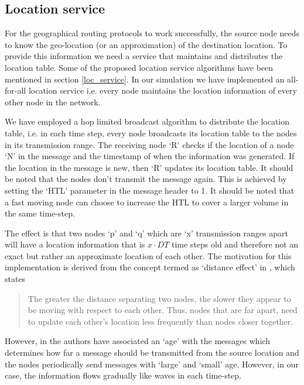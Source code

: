 \subsection{Location service} \label{loc_service_impl}

For the geographical routing protocols to work successfully, the source node needs to know the geo-location (or an approximation) of the destination location. To provide this information we need a service that maintains and distributes the location table. Some of the proposed location service algorithms have been mentioned in section \ref{loc_service}. In our simulation we have implemented an all-for-all location service i.e. every node maintains the location information of every other node in the network. 

We have employed a hop limited broadcast algorithm to distribute the location table, i.e. in each time step, every node broadcasts its location table to the nodes in its transmission range. The receiving node `R' checks if the location of a node `N' in the message and the timestamp of when the information was generated. If the location in the message is new, then `R' updates its location table. It should be noted that the nodes don't transmit the message again. This is achieved by setting the `HTL' parameter in the message header to 1. It should be noted that a fast moving node can choose to increase the HTL to cover a larger volume in the same time-step.

The effect is that two nodes `p' and `q' which are `x' transmission ranges apart will have a location information that is $x \cdot DT $ time steps old and therefore not an exact but rather an approximate location of each other. The motivation for this implementation is derived from the concept termed as `distance effect' in \cite{Basagni:1998:DRE:288235.288254}, which states
\begin{quotation}
The greater the distance separating two nodes, the slower they appear to be moving with respect to each other. Thus, nodes that are far apart, need to update each other's location less frequently than nodes closer together.
\end{quotation}
However, in \cite{Basagni:1998:DRE:288235.288254} the authors have associated an `age' with the messages which determines how far a message should be transmitted from the source location and the nodes periodically send messages with `large' and `small' age. However, in our case, the information flows gradually like waves in each time-step.

